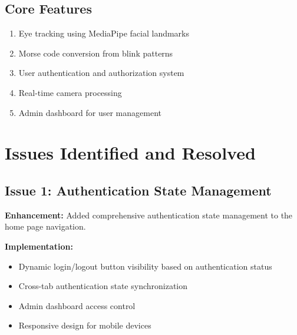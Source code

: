 \documentclass[12pt,a4paper]{article}
\begin{document}
\subsection{Core Features}
\begin{enumerate}
    \item Eye tracking using MediaPipe facial landmarks
    \item Morse code conversion from blink patterns
    \item User authentication and authorization system
    \item Real-time camera processing
    \item Admin dashboard for user management
\end{enumerate}

\section{Issues Identified and Resolved}

\subsection{Issue 1: Authentication State Management}

\textbf{Enhancement:} Added comprehensive authentication state management to the home page navigation.

\textbf{Implementation:}
\begin{itemize}
    \item Dynamic login/logout button visibility based on authentication status
    \item Cross-tab authentication state synchronization
    \item Admin dashboard access control
    \item Responsive design for mobile devices
\end{itemize}
\end{document}
